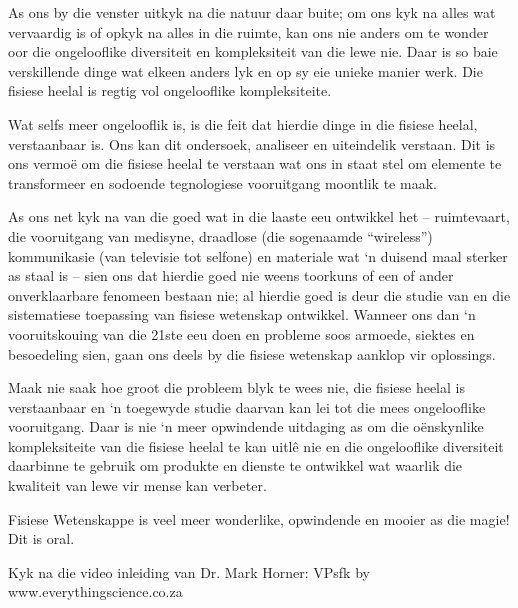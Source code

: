 { \Large
As ons by die venster uitkyk na die natuur daar buite; om ons kyk na alles wat vervaardig is of opkyk na alles in die ruimte, kan ons nie anders om te wonder oor die ongelooflike diversiteit en kompleksiteit van die lewe nie. Daar is so baie verskillende dinge wat elkeen anders lyk en op sy eie unieke manier werk. Die fisiese heelal is regtig vol ongelooflike kompleksiteite.\par

Wat selfs meer ongelooflik is, is die feit dat hierdie dinge in die fisiese heelal, verstaanbaar is. Ons kan dit ondersoek, analiseer en uiteindelik verstaan. Dit is ons vermoë om die fisiese heelal te verstaan wat ons in staat stel om elemente te transformeer en sodoende tegnologiese vooruitgang moontlik te maak.\par

As ons net kyk na van die goed wat in die laaste eeu ontwikkel het – ruimtevaart, die vooruitgang van medisyne, draadlose (die sogenaamde “wireless”) kommunikasie (van televisie tot selfone) en materiale wat ‘n duisend maal sterker as staal is – sien ons dat hierdie goed nie weens toorkuns of een of ander onverklaarbare fenomeen bestaan nie; al hierdie goed is deur die studie van en die sistematiese toepassing van fisiese wetenskap ontwikkel. Wanneer ons dan ‘n vooruitskouing van die 21ste eeu doen en probleme soos armoede, siektes en besoedeling sien, gaan ons deels by die fisiese wetenskap aanklop vir oplossings. \par

Maak nie saak hoe groot die probleem blyk te wees nie, die fisiese heelal is verstaanbaar en ‘n toegewyde studie daarvan kan lei tot die mees ongelooflike vooruitgang. Daar is nie ‘n meer opwindende uitdaging as om die oënskynlike kompleksiteite van die fisiese heelal te kan uitlê nie en die ongelooflike diversiteit daarbinne te gebruik om produkte en dienste te ontwikkel wat waarlik die kwaliteit van lewe vir mense kan verbeter.\par

Fisiese Wetenskappe is veel meer wonderlike, opwindende en mooier as die magie! Dit is oral.

Kyk na die video inleiding van Dr. Mark Horner:  VPsfk  by www.everythingscience.co.za

}





